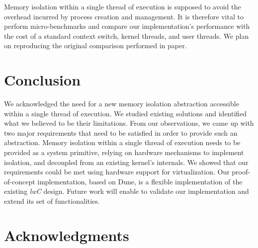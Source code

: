 \documentclass[letterpaper,twocolumn,10pt]{article}
\begin{document}
Memory isolation within a single thread of execution is supposed to avoid the overhead incurred by process creation and management.
It is therefore vital to perform micro-benchmarks and compare our implementation's performance with the cost of a standard context switch, kernel threads, and user threads.
We plan on reproducing the original comparison performed in paper\cite{DBLP:conf/osdi/LittonVE0BD16}.

\section{Conclusion}\label{conclusion}
We acknowledged the need for a new memory isolation abstraction accessible within a single thread of execution.
We studied existing solutions and identified what we believed to be their limitations.
From our observations, we came up with two major requirements that need to be satisfied in order to provide such an abstraction.
Memory isolation within a single thread of execution needs to be provided as a system primitive, relying on hardware mechanisms to implement isolation, and decoupled from an existing kernel's internals.
We showed that our requirements could be met using hardware support for virtualization.
Our proof-of-concept implementation, based on Dune, is a flexible implementation of the existing \emph{lwC} design.
Future work will enable to validate our implementation and extend its set of functionalities.

\section{Acknowledgments}
%
%

%
{\footnotesize 
}


\theendnotes
\end{document}
